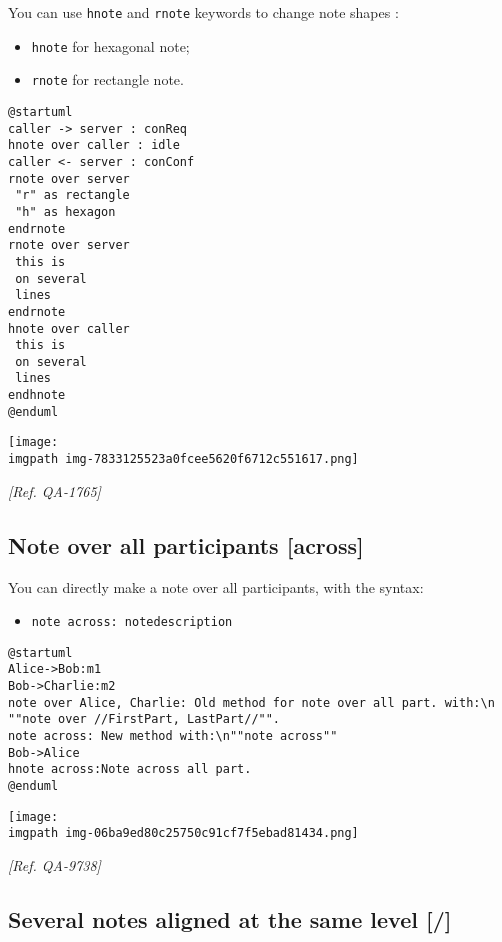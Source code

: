 You can use \texttt{hnote} and \texttt{rnote} keywords
to change note shapes :
\begin{itemize}
\item \texttt{hnote} for hexagonal note;
\item \texttt{rnote} for rectangle note.
\end{itemize}
\begin{verbatim}
@startuml
caller -> server : conReq
hnote over caller : idle
caller <- server : conConf
rnote over server
 "r" as rectangle
 "h" as hexagon
endrnote
rnote over server
 this is
 on several
 lines
endrnote
hnote over caller
 this is
 on several
 lines
endhnote
@enduml
\end{verbatim}
\begin{center}
\texttt{[image: \\imgpath img-7833125523a0fcee5620f6712c551617.png]}
\end{center}


\textit{[Ref. QA-1765]}
%
%
\subsection{Note over all participants [across]}


You can directly make a note over all participants, with the syntax:
\begin{itemize}
\item \texttt{note across: note\textunderscore description}
\end{itemize}


\begin{verbatim}
@startuml
Alice->Bob:m1
Bob->Charlie:m2
note over Alice, Charlie: Old method for note over all part. with:\n ""note over //FirstPart, LastPart//"".
note across: New method with:\n""note across""
Bob->Alice
hnote across:Note across all part.
@enduml
\end{verbatim}
\begin{center}
\texttt{[image: \\imgpath img-06ba9ed80c25750c91cf7f5ebad81434.png]}
\end{center}


\textit{[Ref. QA-9738]}
%
%
\subsection{Several notes aligned at the same level [/]}


